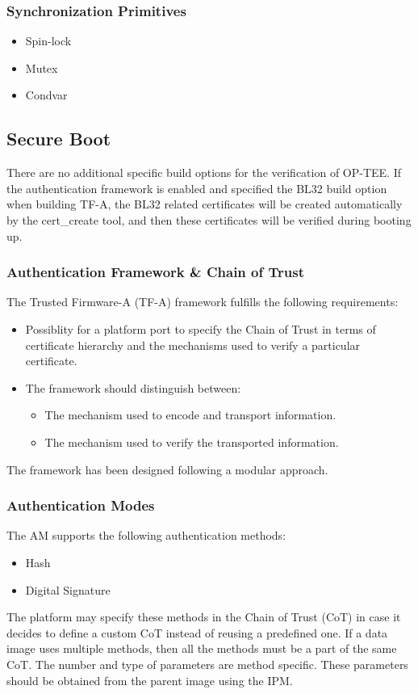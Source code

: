 \documentclass{article}
\begin{document}
\subsubsection{Synchronization Primitives}

\begin{itemize}
\item Spin-lock
\item Mutex
\item Condvar
\end{itemize}

\subsection{Secure Boot}

There are no additional specific build options for the verification of OP-TEE. If the authentication framework is enabled and specified the BL32 build option when building TF-A, the BL32 related certificates will be created automatically by the cert\_create tool, and then these certificates will be verified during booting up.

\subsubsection{Authentication Framework \& Chain of Trust}

The Trusted Firmware-A (TF-A) framework fulfills the following requirements: \begin{itemize}
\item Possiblity for a platform port to specify the Chain of Trust in terms of certificate hierarchy and the mechanisms used to verify a particular certificate.
\item The framework should distinguish between:
\begin{itemize}
\item The mechanism used to encode and transport information.
\item The mechanism used to verify the transported information.
\end{itemize}
\end{itemize}
The framework has been designed following a modular approach.

\subsubsection{Authentication Modes}

The AM supports the following authentication methods: \begin{itemize}
\item Hash
\item Digital Signature
\end{itemize}
The platform may specify these methods in the Chain of Trust (CoT) in case it decides to define a custom CoT instead of reusing a predefined one. If a data image uses multiple methods, then all the methods must be a part of the same CoT. The number and type of parameters are method specific. These parameters should be obtained from the parent image using the IPM.
\end{document}
